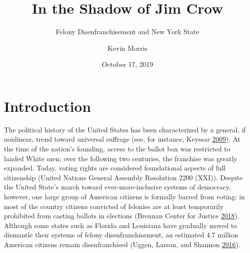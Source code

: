 \documentclass[12pt,]{article}
\title{In the Shadow of Jim Crow}
\subtitle{Felony Disenfranchisement and New York State}
\author{Kevin Morris}
\date{October 17, 2019}
\begin{document}
\maketitle


\tableofcontents
\pagebreak


\hypertarget{introduction}{%
\section{Introduction}\label{introduction}}

The political history of the United States has been characterized by a general, if nonlinear, trend toward universal suffrage (see, for instance, Keyssar \protect\hyperlink{ref-Keyssar2009}{2009}). At the time of the nation's founding, access to the ballot box was restricted to landed White men; over the following two centuries, the franchise was greatly expanded. Today, voting rights are considered foundational aspects of full citizenship (United Nations General Assembly Resolution 2200 (XXI)). Despite the United State's march toward ever-more-inclusive systems of democracy, however, one large group of American citizens is formally barred from voting: in most of the country citizens convicted of felonies are at least temporarily prohibited from casting ballots in elections (Brennan Center for Justice \protect\hyperlink{ref-bcj_laws}{2018}). Although some states such as Florida and Louisiana have gradually moved to dismantle their systems of felony disenfranchisement, an estimated 4.7 million American citizens remain disenfranchised (Uggen, Larson, and Shannon \protect\hyperlink{ref-sentencing_2016}{2016}).
\end{document}
